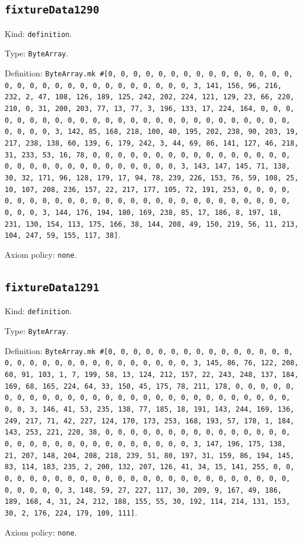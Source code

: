 \documentclass[11pt]{article}
\begin{document}
\subsection*{\texttt{fixtureData1290}}
\noindent Kind: \texttt{definition}.\par
\noindent Type: \texttt{ByteArray}.\par
\noindent Definition: \texttt{ByteArray.mk \#[0, 0, 0, 0, 0, 0, 0, 0, 0, 0, 0, 0, 0, 0, 0, 0, 0, 0, 0, 0, 0, 0, 0, 0, 0, 0, 0, 0, 0, 0, 3, 141, 156, 96, 216, 232, 2, 47, 108, 126, 189, 125, 242, 202, 224, 121, 129, 23, 66, 220, 210, 0, 31, 200, 203, 77, 13, 77, 3, 196, 133, 17, 224, 164, 0, 0, 0, 0, 0, 0, 0, 0, 0, 0, 0, 0, 0, 0, 0, 0, 0, 0, 0, 0, 0, 0, 0, 0, 0, 0, 0, 0, 0, 0, 3, 142, 85, 168, 218, 100, 40, 195, 202, 238, 90, 203, 19, 217, 238, 138, 60, 139, 6, 179, 242, 3, 44, 69, 86, 141, 127, 46, 218, 31, 233, 53, 16, 78, 0, 0, 0, 0, 0, 0, 0, 0, 0, 0, 0, 0, 0, 0, 0, 0, 0, 0, 0, 0, 0, 0, 0, 0, 0, 0, 0, 0, 0, 0, 3, 143, 147, 145, 71, 138, 30, 32, 171, 96, 128, 179, 17, 94, 78, 239, 226, 153, 76, 59, 108, 25, 10, 107, 208, 236, 157, 22, 217, 177, 105, 72, 191, 253, 0, 0, 0, 0, 0, 0, 0, 0, 0, 0, 0, 0, 0, 0, 0, 0, 0, 0, 0, 0, 0, 0, 0, 0, 0, 0, 0, 0, 0, 0, 3, 144, 176, 194, 180, 169, 238, 85, 17, 186, 8, 197, 18, 231, 130, 154, 113, 175, 166, 38, 144, 208, 49, 150, 219, 56, 11, 213, 104, 247, 59, 155, 117, 38]}.\par
\noindent Axiom policy: \texttt{none}.\par
\subsection*{\texttt{fixtureData1291}}
\noindent Kind: \texttt{definition}.\par
\noindent Type: \texttt{ByteArray}.\par
\noindent Definition: \texttt{ByteArray.mk \#[0, 0, 0, 0, 0, 0, 0, 0, 0, 0, 0, 0, 0, 0, 0, 0, 0, 0, 0, 0, 0, 0, 0, 0, 0, 0, 0, 0, 0, 0, 3, 145, 86, 76, 122, 208, 60, 91, 103, 1, 7, 199, 58, 13, 124, 212, 157, 22, 243, 248, 137, 184, 169, 68, 165, 224, 64, 33, 150, 45, 175, 78, 211, 178, 0, 0, 0, 0, 0, 0, 0, 0, 0, 0, 0, 0, 0, 0, 0, 0, 0, 0, 0, 0, 0, 0, 0, 0, 0, 0, 0, 0, 0, 0, 3, 146, 41, 53, 235, 138, 77, 185, 18, 191, 143, 244, 169, 136, 249, 217, 71, 42, 227, 124, 170, 173, 253, 168, 193, 57, 178, 1, 184, 143, 253, 221, 220, 38, 0, 0, 0, 0, 0, 0, 0, 0, 0, 0, 0, 0, 0, 0, 0, 0, 0, 0, 0, 0, 0, 0, 0, 0, 0, 0, 0, 0, 0, 0, 3, 147, 196, 175, 138, 21, 207, 148, 204, 208, 218, 239, 51, 80, 197, 31, 159, 86, 194, 145, 83, 114, 183, 235, 2, 200, 132, 207, 126, 41, 34, 15, 141, 255, 0, 0, 0, 0, 0, 0, 0, 0, 0, 0, 0, 0, 0, 0, 0, 0, 0, 0, 0, 0, 0, 0, 0, 0, 0, 0, 0, 0, 0, 0, 3, 148, 59, 27, 227, 117, 30, 209, 9, 167, 49, 186, 189, 168, 4, 31, 24, 212, 188, 155, 55, 30, 192, 114, 214, 131, 153, 30, 2, 176, 224, 179, 109, 111]}.\par
\noindent Axiom policy: \texttt{none}.\par
\end{document}
